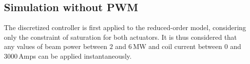 \documentclass[12pt]{iopart}
\begin{document}
\subsection{Simulation without PWM}
\label{noPWM}

The discretized controller is first applied to the reduced-order model, considering only the constraint of saturation for both actuators. It is thus considered that any values of beam power between $2$ and $6$\,MW and coil current between $0$ and $3000$\,Amps can be applied instantaneously.   

\end{document}
